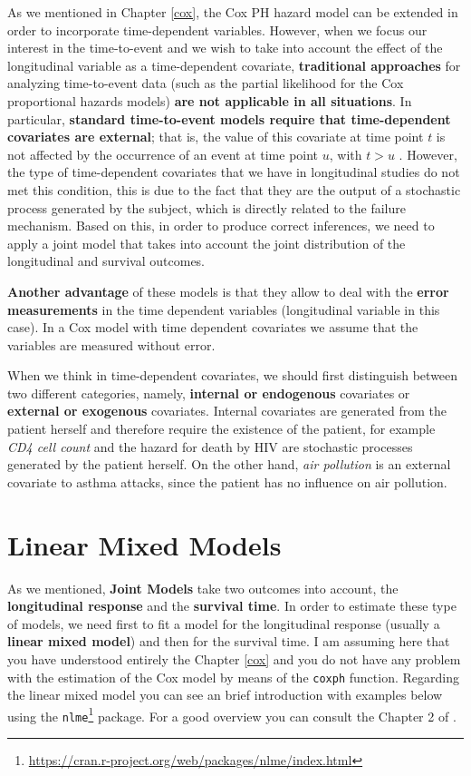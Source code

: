 \documentclass[]{book}
\let\rmarkdownfootnote\footnote%
\def\footnote{\protect\rmarkdownfootnote}
\renewcommand{\href}[2]{#2\footnote{\url{#1}}}
\theoremstyle{definition}
\theoremstyle{definition}
\theoremstyle{definition}
\theoremstyle{remark}
\let\BeginKnitrBlock\begin \let\EndKnitrBlock\end
\begin{document}
As we mentioned in Chapter \ref{cox}, the Cox PH hazard model can be
extended in order to incorporate time-dependent variables. However, when
we focus our interest in the time-to-event and we wish to take into
account the effect of the longitudinal variable as a time-dependent
covariate, \textbf{traditional approaches} for analyzing time-to-event
data (such as the partial likelihood for the Cox proportional hazards
models) \textbf{are not applicable in all situations}. In particular,
\textbf{standard time-to-event models require that time-dependent
covariates are external}; that is, the value of this covariate at time
point \(t\) is not affected by the occurrence of an event at time point
\(u\), with \(t > u\) \citep[Section 6.3]{kalbfleisch1980statistical}.
However, the type of time-dependent covariates that we have in
longitudinal studies do not met this condition, this is due to the fact
that they are the output of a stochastic process generated by the
subject, which is directly related to the failure mechanism. Based on
this, in order to produce correct inferences, we need to apply a joint
model that takes into account the joint distribution of the longitudinal
and survival outcomes.

\textbf{Another advantage} of these models is that they allow to deal
with the \textbf{error measurements} in the time dependent variables
(longitudinal variable in this case). In a Cox model with time dependent
covariates we assume that the variables are measured without error.

\BeginKnitrBlock{rmdhint_sestelo}
When we think in time-dependent covariates, we should first distinguish
between two different categories, namely, \textbf{internal or
endogenous} covariates or \textbf{external or exogenous} covariates.
Internal covariates are generated from the patient herself and therefore
require the existence of the patient, for example \emph{CD4 cell count}
and the hazard for death by HIV are stochastic processes generated by
the patient herself. On the other hand, \emph{air pollution} is an
external covariate to asthma attacks, since the patient has no influence
on air pollution.
\EndKnitrBlock{rmdhint_sestelo}

\section{Linear Mixed Models}\label{linear-mixed-models}

As we mentioned, \textbf{Joint Models} take two outcomes into account,
the \textbf{longitudinal response} and the \textbf{survival time}. In
order to estimate these type of models, we need first to fit a model for
the longitudinal response (usually a \textbf{linear mixed model}) and
then for the survival time. I am assuming here that you have understood
entirely the Chapter \ref{cox} and you do not have any problem with the
estimation of the Cox model by means of the \texttt{coxph} function.
Regarding the linear mixed model you can see an brief introduction with
examples below using the
\href{https://cran.r-project.org/web/packages/nlme/index.html}{\texttt{nlme}}
package. For a good overview you can consult the Chapter 2 of
\citet{book:1606416}.
\end{document}
